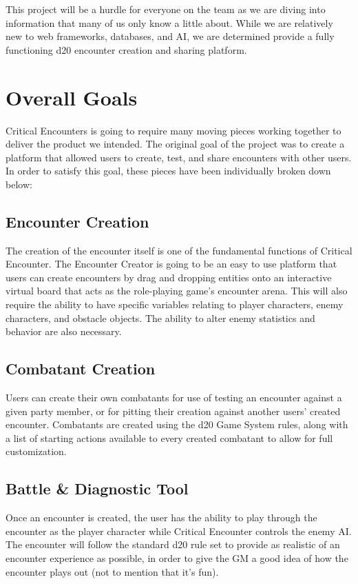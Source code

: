 \documentclass[12pt,a4paper]{report}
\begin{document}
This project will be a hurdle for everyone on the team as we are diving into information that many of us only know a little about. While we are relatively new to web frameworks, databases, and AI, we are determined provide a fully functioning d20 encounter creation and sharing platform.
	\section{Overall Goals}
	Critical Encounters is going to require many moving pieces working together to deliver the product we intended. The original goal of the project was to create a platform that allowed users to create, test, and share encounters with other users. In order to satisfy this goal, these pieces have been individually broken down below:
		\subsection{Encounter Creation}
		The creation of the encounter itself is one of the fundamental functions of Critical Encounter. The Encounter Creator is going to be an easy to use platform that users can create encounters by drag and dropping entities onto an interactive virtual board that acts as the role-playing game's encounter arena. This will also require the ability to have specific variables relating to player characters, enemy characters, and obstacle objects. The ability to alter enemy statistics and behavior are also necessary.
		\subsection{Combatant Creation}
		Users can create their own combatants for use of testing an encounter against a given party member, or for pitting their creation against another users' created encounter. Combatants are created using the d20 Game System rules, along with a list of starting actions available to every created combatant to allow for full customization.
		\subsection{Battle \& Diagnostic Tool}
		Once an encounter is created, the user has the ability to play through the encounter as the player character while Critical Encounter controls the enemy AI. The encounter will follow the standard d20 rule set to provide as realistic of an encounter experience as possible, in order to give the GM a good idea of how the encounter plays out (not to mention that it's fun).
		
\end{document}
